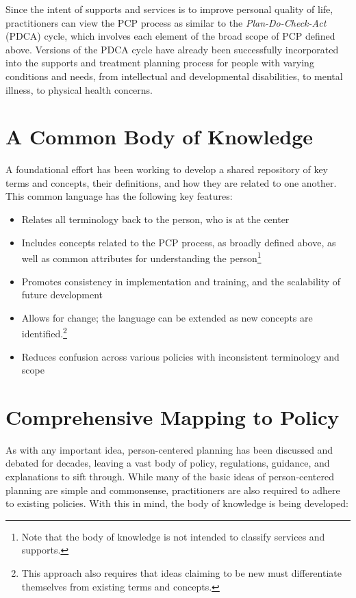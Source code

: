\documentclass[
]{book}
\providecommand{\tightlist}{%
  \setlength{\itemsep}{0pt}\setlength{\parskip}{0pt}}
\begin{document}
Since the intent of supports and services is to improve personal quality of life, practitioners can view the PCP process as similar to the \emph{Plan-Do-Check-Act} (PDCA) cycle, which involves each element of the broad scope of PCP defined above. Versions of the PDCA cycle have already been successfully incorporated into the supports and treatment planning process for people with varying conditions and needs, from intellectual and developmental disabilities, to mental illness, to physical health concerns.

\hypertarget{bok}{%
\chapter{A Common Body of Knowledge}\label{bok}}

A foundational effort has been working to develop a shared repository of key terms and concepts, their definitions, and how they are related to one another. This common language has the following key features:

\begin{itemize}
\tightlist
\item
  Relates all terminology back to the person, who is at the center
\item
  Includes concepts related to the PCP process, as broadly defined above, as well as common attributes for understanding the person\footnote{Note that the body of knowledge is not intended to classify services and supports.}
\item
  Promotes consistency in implementation and training, and the scalability of future development
\item
  Allows for change; the language can be extended as new concepts are identified.\footnote{This approach also requires that ideas claiming to be new must differentiate themselves from existing terms and concepts.}
\item
  Reduces confusion across various policies with inconsistent terminology and scope
\end{itemize}

\hypertarget{policy}{%
\chapter{Comprehensive Mapping to Policy}\label{policy}}

As with any important idea, person-centered planning has been discussed and debated for decades, leaving a vast body of policy, regulations, guidance, and explanations to sift through. While many of the basic ideas of person-centered planning are simple and commonsense, practitioners are also required to adhere to existing policies. With this in mind, the body of knowledge is being developed:
\end{document}
